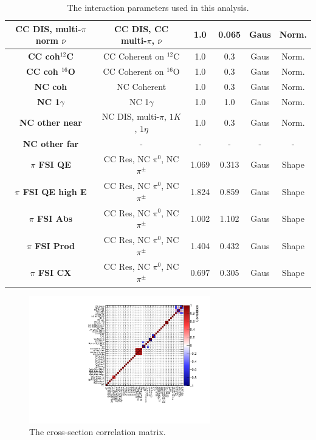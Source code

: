 \begin{center}
\begin{table}
\begin{adjustwidth}{-.9in}{-.9in}
{\begin{tabular}{ c||c|c|c|c|c}
\hline
\textbf{CC DIS, multi-$\pi$ norm $\bar{\nu}$} & CC DIS, CC multi-$\pi$, $\bar{\nu}$ & 1.0 & 0.065 & Gaus & Norm.\\
\hline
\textbf{CC coh$^{12}$C} & CC Coherent on $^{12}$C & 1.0 & 0.3 & Gaus & Norm.\\
\hline
\textbf{CC coh $^{16}$O} & CC Coherent on $^{16}$O & 1.0 & 0.3 &  Gaus & Norm.\\
\hline
\textbf{NC coh} & NC Coherent & 1.0 & 0.3 & Gaus & Norm.\\
\hline
\textbf{NC 1$\gamma$} & NC 1$\gamma$ & 1.0 & 1.0 & Gaus & Norm.\\
\hline
\textbf{NC other near} & NC DIS, multi-$\pi$, $1K$, $1\eta$ & 1.0 & 0.3 & Gaus & Norm.\\
\hline
\textbf{NC other far} & - & - & - & - & -\\
\hline
\textbf{$\pi$ FSI QE} & CC Res, NC $\pi^{0}$, NC $\pi^{\pm}$ & 1.069 & 0.313 & Gaus & Shape\\
\hline
\textbf{$\pi$ FSI QE high E} & CC Res, NC $\pi^{0}$, NC $\pi^{\pm}$ & 1.824 & 0.859 & Gaus & Shape\\
\hline
\textbf{$\pi$ FSI Abs} &  CC Res, NC $\pi^{0}$, NC $\pi^{\pm}$ & 1.002 & 1.102 & Gaus & Shape\\
\hline
\textbf{$\pi$ FSI Prod} & CC Res, NC $\pi^{0}$, NC $\pi^{\pm}$ & 1.404 & 0.432 & Gaus & Shape\\
\hline
\textbf{$\pi$ FSI CX} &  CC Res, NC $\pi^{0}$, NC $\pi^{\pm}$ & 0.697 & 0.305 & Gaus & Shape\\
\hline
\hline
\end{tabular}}
\caption{The interaction parameters used in this analysis.}\label{tab:xsecparams}
\end{adjustwidth}
\end{table}
\end{center}

\begin{figure}[!htbp]
\centering
\includegraphics*[width=0.7\textwidth,clip]{figs/xseccorr}
\caption{The cross-section correlation matrix.}\label{fig:xseccov}
\end{figure}

